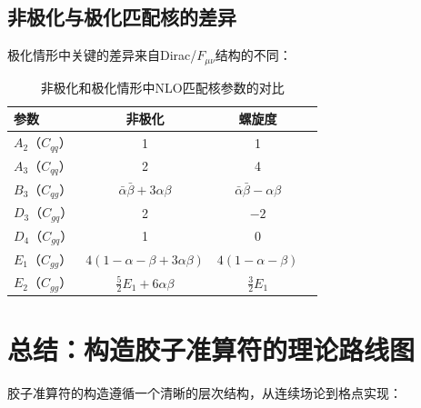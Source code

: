 \documentclass[12pt,a4paper]{ctexart}
\theoremstyle{definition}
\begin{document}
\subsection{非极化与极化匹配核的差异}

极化情形中关键的差异来自Dirac/$F_{\mu\nu}$结构的不同\cite{Yao2023}：

\begin{table}[H]
\centering
\caption{非极化和极化情形中NLO匹配核参数的对比\cite{Yao2023}}
\label{tab:unpol_vs_pol}
\begin{tabular}{lccc}
\toprule
参数 & 非极化 & 螺旋度 \\
\midrule
$A_2$（$C_{qq}$）     & 1   & 1 \\
$A_3$（$C_{qq}$）     & 2   & 4 \\
$B_3$（$C_{qg}$）     & $\bar{\alpha}\bar{\beta}+3\alpha\beta$ & $\bar{\alpha}\bar{\beta}-\alpha\beta$ \\
$D_3$（$C_{gq}$）     & 2   & $-2$ \\
$D_4$（$C_{gq}$）     & 1   & 0 \\
$E_1$（$C_{gg}$）     & $4(1-\alpha-\beta+3\alpha\beta)$ & $4(1-\alpha-\beta)$ \\
$E_2$（$C_{gg}$）     & $\frac{5}{2}E_1 + 6\alpha\beta$ & $\frac{3}{2}E_1$ \\
\bottomrule
\end{tabular}
\end{table}

\section{总结：构造胶子准算符的理论路线图}

胶子准算符的构造遵循一个清晰的层次结构，从连续场论到格点实现：
\end{document}
